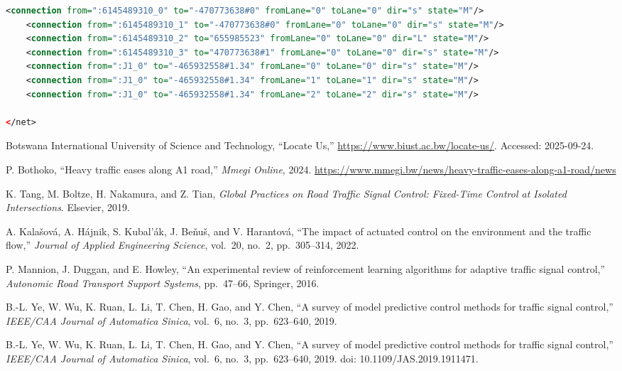 \documentclass[11pt, a4paper]{report}
\begin{document}
\begin{lstlisting}[language=XML, caption={SUMO Palapye Location Code --- Tsotlhe N. Seiphepi (ID: 21001137)}]
    <connection from=":6145489310_0" to="-470773638#0" fromLane="0" toLane="0" dir="s" state="M"/>
    <connection from=":6145489310_1" to="-470773638#0" fromLane="0" toLane="0" dir="s" state="M"/>
    <connection from=":6145489310_2" to="655985523" fromLane="0" toLane="0" dir="L" state="M"/>
    <connection from=":6145489310_3" to="470773638#1" fromLane="0" toLane="0" dir="s" state="M"/>
    <connection from=":J1_0" to="-465932558#1.34" fromLane="0" toLane="0" dir="s" state="M"/>
    <connection from=":J1_0" to="-465932558#1.34" fromLane="1" toLane="1" dir="s" state="M"/>
    <connection from=":J1_0" to="-465932558#1.34" fromLane="2" toLane="2" dir="s" state="M"/>

</net>

\end{lstlisting}
\begin{thebibliography}{99}

Botswana International University of Science and Technology, ``Locate Us,''
\url{https://www.biust.ac.bw/locate-us/}. Accessed: 2025-09-24.

P. Bothoko, ``Heavy traffic eases along A1 road,'' \textit{Mmegi Online}, 2024.
\url{https://www.mmegi.bw/news/heavy-traffic-eases-along-a1-road/news}

K. Tang, M. Boltze, H. Nakamura, and Z. Tian,
\textit{Global Practices on Road Traffic Signal Control: Fixed-Time Control at Isolated Intersections}.
Elsevier, 2019.

A. Kala\v{s}ov\'{a}, A. H\'{a}jnik, S. Kubal'\'{a}k, J. Be\v{n}u\v{s}, and V. Harantov\'{a},
``The impact of actuated control on the environment and the traffic flow,''
\textit{Journal of Applied Engineering Science}, vol.~20, no.~2, pp.~305--314, 2022.

P. Mannion, J. Duggan, and E. Howley,
``An experimental review of reinforcement learning algorithms for adaptive traffic signal control,''
\textit{Autonomic Road Transport Support Systems}, pp.~47--66, Springer, 2016.

B.-L. Ye, W. Wu, K. Ruan, L. Li, T. Chen, H. Gao, and Y. Chen,
``A survey of model predictive control methods for traffic signal control,''
\textit{IEEE/CAA Journal of Automatica Sinica}, vol.~6, no.~3, pp.~623--640, 2019.

B.-L. Ye, W. Wu, K. Ruan, L. Li, T. Chen, H. Gao, and Y. Chen,
``A survey of model predictive control methods for traffic signal control,''
\textit{IEEE/CAA Journal of Automatica Sinica}, vol.~6, no.~3, pp.~623--640, 2019.
doi: 10.1109/JAS.2019.1911471.


\end{thebibliography}
\end{document}
